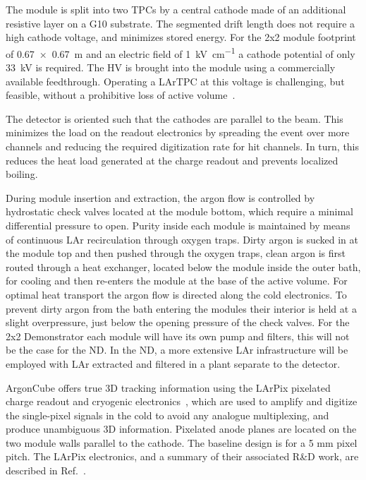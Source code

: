 The module is split into two TPCs by a central cathode made of an additional resistive layer on a G10 substrate. The segmented drift length does not require a high cathode voltage, and minimizes stored energy. For the 2x2 module footprint of \SI{0.67 x 0.67}{\metre} and an electric field of \SI{1}{\kilo\volt\per\centi\metre} a cathode potential of only \SI{33}{\kilo\volt} is required. The HV is brought into the module using a commercially available feedthrough. Operating a LArTPC at this voltage is challenging, but feasible, without a prohibitive loss of active volume~\cite{argontube}.

The detector is oriented such that the cathodes are parallel to the beam. This minimizes the load on the readout electronics by spreading the event over more channels and reducing the required digitization rate for hit channels. In turn, this reduces the heat load generated at the charge readout and prevents localized boiling.


During module insertion and extraction, the argon flow is controlled by hydrostatic check valves located at the module bottom, which require a minimal differential pressure to open. Purity inside each module is maintained by means of continuous LAr recirculation through oxygen traps. Dirty argon is sucked in at the module top and then pushed through the oxygen traps, clean argon is first routed through a heat exchanger, located below the module inside the outer bath, for cooling and then re-enters the module at the base of the active volume. For optimal heat transport the argon flow is directed along the cold electronics. To prevent dirty argon from the bath entering the modules their interior is held at a slight overpressure, just below the opening pressure of the check valves. For the 2x2 Demonstrator each module will have its own pump and filters, this will not be the case for the ND. In the ND, a more extensive LAr infrastructure will be employed with LAr extracted and filtered in a plant separate to the detector.  

ArgonCube offers true 3D tracking information using the LArPix pixelated charge readout and cryogenic electronics~\cite{larpix}, which are used to amplify and digitize the single-pixel signals in the cold to avoid any analogue multiplexing, and produce unambiguous 3D information. Pixelated anode planes are located on the two module walls parallel to the cathode. The baseline design is for a 5 mm pixel pitch. The LArPix electronics, and a summary of their associated R\&D work, are described in Ref.~\cite{larpix}.

